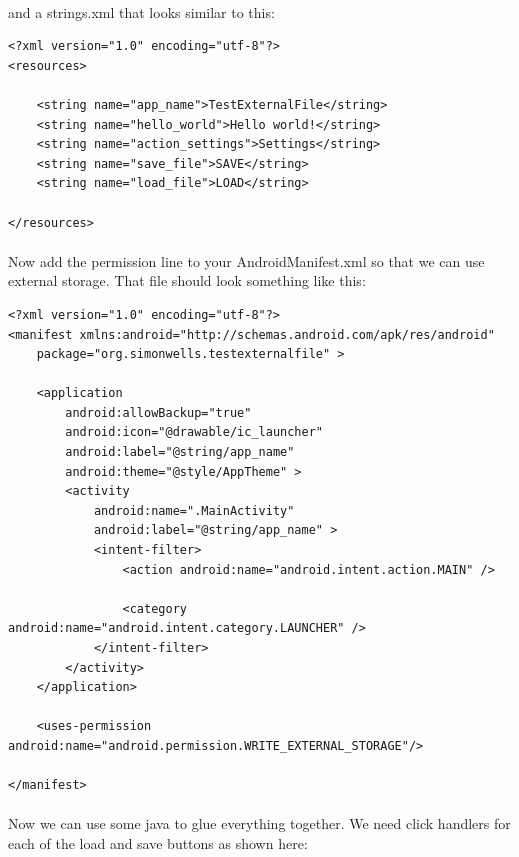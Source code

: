 \documentclass[12pt, a4paper, twoside]{book}
\begin{document}
\paragraph{} and a strings.xml that looks similar to this:

\begin{lstlisting}
<?xml version="1.0" encoding="utf-8"?>
<resources>

    <string name="app_name">TestExternalFile</string>
    <string name="hello_world">Hello world!</string>
    <string name="action_settings">Settings</string>
    <string name="save_file">SAVE</string>
    <string name="load_file">LOAD</string>

</resources>
\end{lstlisting}

\paragraph{} Now add the permission line to your AndroidManifest.xml so that we can use external storage. That file should look something like this:

\begin{lstlisting}
<?xml version="1.0" encoding="utf-8"?>
<manifest xmlns:android="http://schemas.android.com/apk/res/android"
    package="org.simonwells.testexternalfile" >

    <application
        android:allowBackup="true"
        android:icon="@drawable/ic_launcher"
        android:label="@string/app_name"
        android:theme="@style/AppTheme" >
        <activity
            android:name=".MainActivity"
            android:label="@string/app_name" >
            <intent-filter>
                <action android:name="android.intent.action.MAIN" />

                <category android:name="android.intent.category.LAUNCHER" />
            </intent-filter>
        </activity>
    </application>

    <uses-permission android:name="android.permission.WRITE_EXTERNAL_STORAGE"/>

</manifest>

\end{lstlisting}

\paragraph{} Now we can use some java to glue everything together. We need click handlers for each of the load and save buttons as shown here:
\end{document}
